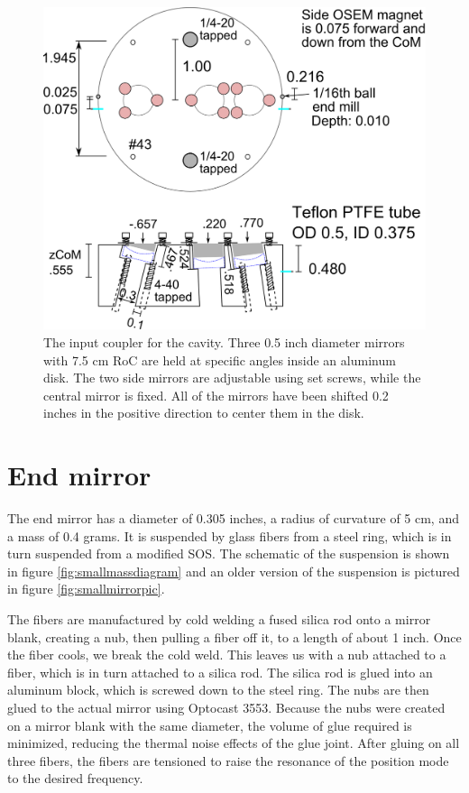 \begin{figure}[hp]
	\centering
		\includegraphics[width=.9\textwidth]{figures/suspensions/inputcoupler.png}
	\caption[Input coupler]{The input coupler for the cavity. Three 0.5 inch diameter mirrors with 7.5 cm RoC are held at specific angles inside an aluminum disk. The two side mirrors are adjustable using set screws, while the central mirror is fixed. All of the mirrors have been shifted 0.2 inches in the positive direction to center them in the disk.}
	\label{fig:inputcoupler}
\end{figure}
 
\section{End mirror}
\label{sec:endMirror}
The end mirror has a diameter of 0.305 inches, a radius of curvature of 5 cm, and a mass of 0.4 grams. It is suspended by glass fibers from a steel ring, which is in turn suspended from a modified SOS. The schematic of the suspension is shown in figure \ref{fig:smallmassdiagram} and an older version of the suspension is pictured in figure \ref{fig:smallmirrorpic}.

The fibers are manufactured by cold welding a fused silica rod onto a mirror blank, creating a nub, then pulling a fiber off it, to a length of about 1 inch. Once the fiber cools, we break the cold weld. This leaves us with a nub attached to a fiber, which is in turn attached to a silica rod. The silica rod is glued into an aluminum block, which is screwed down to the steel ring. The nubs are then glued to the actual mirror using Optocast 3553. Because the nubs were created on a mirror blank with the same diameter, the volume of glue required is minimized, reducing the thermal noise effects of the glue joint. After gluing on all three fibers, the fibers are tensioned to raise the resonance of the position mode to the desired frequency.


